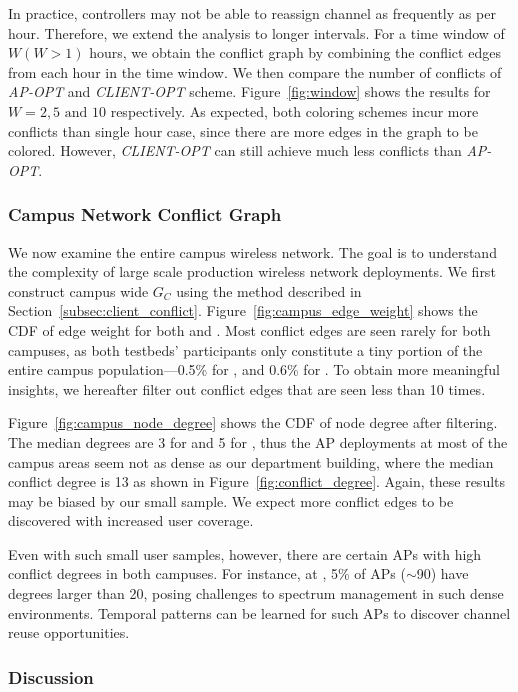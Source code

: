 In practice, controllers may not be able to reassign channel as frequently as
per hour. Therefore, we extend the analysis to longer intervals. For a time
window of $W (W>1)$ hours, we obtain the conflict graph by combining the
conflict edges from each hour in the time window. We then compare the number of
conflicts of \textit{AP-OPT} and \textit{CLIENT-OPT} scheme.
Figure~\ref{fig:window} shows the results for $W=2, 5 \text{ and } 10$
respectively. As expected, both coloring schemes incur more conflicts than
single hour case, since there are more edges in the graph to be colored.
However, \textit{CLIENT-OPT} can still achieve much less conflicts than
\textit{AP-OPT}.

\subsubsection{Campus Network Conflict Graph}

We now examine the entire campus wireless network. The goal is to understand
the complexity of large scale production wireless network deployments. We
first construct campus wide $G_C$ using the method described in
Section~\ref{subsec:client_conflict}. Figure~\ref{fig:campus_edge_weight}
shows the CDF of edge weight for both \ub{} and \nd{}. Most conflict edges are seen
rarely for both campuses, as both testbeds' participants only constitute a
tiny portion of the entire campus population---0.5\% for \nd{}, and 0.6\% for
\ub{}. To obtain more meaningful insights, we hereafter filter out conflict
edges that are seen less than 10 times.

Figure~\ref{fig:campus_node_degree} shows the CDF of node degree after
filtering. The median degrees are 3 for \nd{} and 5 for \ub{}, thus the AP
deployments at most of the campus areas seem not as dense as our department
building, where the median conflict degree is 13 as shown in
Figure~\ref{fig:conflict_degree}. Again, these results may be biased by our
small sample. We expect more conflict edges to be discovered with increased
user coverage.

Even with such small user samples, however, there are certain APs with high
conflict degrees in both campuses. For instance, at \ub{}, 5\% of APs ($\sim$90)
have degrees larger than 20, posing challenges to spectrum management in such
dense environments. Temporal patterns can be learned for such APs to discover
channel reuse opportunities.


\subsubsection{Discussion}

